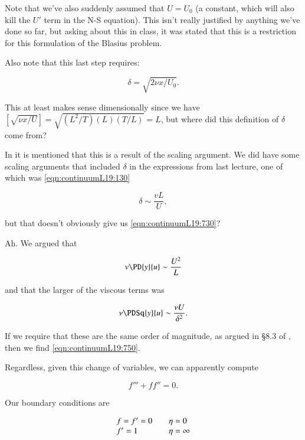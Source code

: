 Note that we've also suddenly assumed that $U = U_0$ (a constant, which will also kill the $U'$ term in the N-S equation).  This isn't really justified by anything we've done so far, but asking about this in class, it was stated that this is a restriction for this formulation of the Blasius problem.

Also note that this last step requires:

\begin{equation}\label{eqn:continuumL19:730}
\delta = \sqrt{ 2 \nu x/U_0 }.
\end{equation}

This at least makes sense dimensionally since we have $[\sqrt{\nu x/U}] = \sqrt{ (L^2/T) (L) (T/L)} = L$, but where did this definition of $\delta$ come from?

In \cite{ wiki:BlasiusBoundary} it is mentioned that this is a result of the scaling argument.  We did have some scaling arguments that included $\delta$ in the expressions from last lecture, one of which was \ref{eqn:continuumL19:130}

\begin{equation}\label{eqn:continuumL19:750}
\delta \sim \frac{v L}{U},
\end{equation}

but that doesn't obviously give us \ref{eqn:continuumL19:730}?

Ah.  We argued that 

\begin{equation}\label{eqn:continuumL19:1130}
v \PD{y}{u} \sim \frac{U^2}{L}
\end{equation}

and that the larger of the viscous terms was

\begin{equation}\label{eqn:continuumL19:1150}
\nu \PDSq{y}{u} \sim \frac{\nu U}{\delta^2}.
\end{equation}

If we require that these are the same order of magnitude, as argued in \S 8.3 of \cite{acheson1990elementary}, then we find \ref{eqn:continuumL19:750}.

Regardless, given this change of variables, we can apparently compute

\begin{equation}\label{eqn:continuumL19:370}
f''' + f f'' = 0.
\end{equation}

Our boundary conditions are

\begin{equation}\label{eqn:continuumL19:390}
\begin{array}{l l}
f = f' = 0 & \quad \mbox{$\eta = 0$} \\
f' = 1 & \quad \mbox{$\eta = \infty$} \\
\end{array}
\end{equation}

